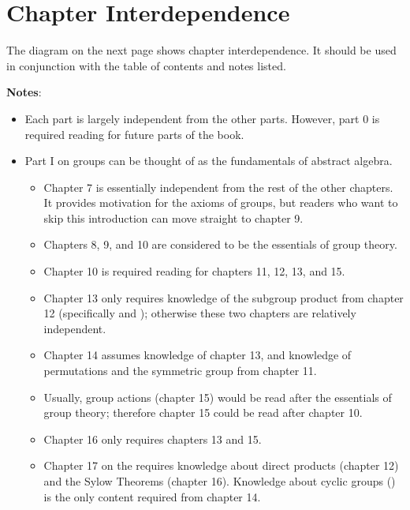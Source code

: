 \section*{Chapter Interdependence}
The diagram on the next page shows chapter interdependence. It should be used in conjunction with the table of contents and notes listed.

\newpage
\begin{center}
\end{center}

\newpage

\textbf{Notes}:
\begin{itemize}
    \item Each part is largely independent from the other parts. However, part 0 is required reading for future parts of the book.
    \item Part I on groups can be thought of as the fundamentals of abstract algebra.
    \begin{itemize}
        \item Chapter 7 is essentially independent from the rest of the other chapters. It provides motivation for the axioms of groups, but readers who want to skip this introduction can move straight to chapter 9.
        \item Chapters 8, 9, and 10 are considered to be the essentials of group theory.
        \item Chapter 10 is required reading for chapters 11, 12, 13, and 15.
        \item Chapter 13 only requires knowledge of the subgroup product from chapter 12 (specifically  and ); otherwise these two chapters are relatively independent.
        \item Chapter 14 assumes knowledge of chapter 13, and knowledge of permutations and the symmetric group from chapter 11.
        \item Usually, group actions (chapter 15) would be read after the essentials of group theory; therefore chapter 15 could be read after chapter 10.
        \item Chapter 16 only requires chapters 13 and 15.
        \item Chapter 17 on the requires knowledge about direct products (chapter 12) and the Sylow Theorems (chapter 16). Knowledge about cyclic groups () is the only content required from chapter 14.

\end{itemize}
\end{itemize}
